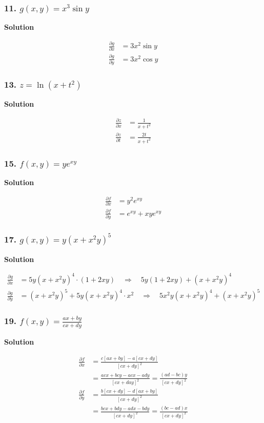 \documentclass{article}
\newcommand\rr{\quad\Rightarrow\quad}
\newcommand{\solution}{\centerline{\textbf{Solution}}}
\begin{document}
\subsubsection*{11. $g(x,y) = x^3 \sin y$}
\solution
\begin{align*}
    \frac{\partial g}{\partial x} &= 3x^2\sin y \\
    \frac{\partial g}{\partial y} &= 3x^2\cos y 
\end{align*}
\subsubsection*{13. $z = \ln (x + t^2)$}
\solution
\begin{align*}
    \frac{\partial z}{\partial x} &= \displaystyle\frac{1}{x+t^2} \\
    \frac{\partial z}{\partial t} &= \displaystyle\frac{2t}{x+t^2} 
\end{align*}
\subsubsection*{15. $f(x,y) = ye^{xy}$}
\solution
\begin{align*}
    \frac{\partial f}{\partial x} &= y^2e^{xy} \\
    \frac{\partial f}{\partial y} &= e^{xy} + xye^{xy}
\end{align*}
\subsubsection*{17. $g(x,y) = y(x + x^2 y)^5$}
\solution
\begin{align*}
    \frac{\partial g}{\partial x} &= 5y(x+x^2y)^4\cdot (1+2xy) \rr 5y(1+2xy) + (x+x^2y)^4 \\
    \frac{\partial g}{\partial y} &= (x+x^2y)^5 + 5y(x+x^2y)^4 \cdot x^2 \rr 5x^2y(x+x^2y)^4 + (x+x^2y)^5
\end{align*}
\subsubsection*{19. $f(x,y) = \displaystyle\frac{ax + by}{cx + dy}$}
\solution
\begin{align*}
    \frac{\partial f}{\partial x} &= \displaystyle\frac{c[ax+by] - a[cx+dy]}{[cx+dy]^2} \\
                    &= \displaystyle\frac{acx+bcy-acx-ady}{[cx+day]^2} = \displaystyle\frac{(ad-bc)y}{[cx+dy]^2} \\
    \frac{\partial f}{\partial y} &= \displaystyle\frac{b[cx+dy] - d[ax+by]}{[cx+dy]^2} \\ 
                                  &= \displaystyle\frac{bcx+bdy-adx-bdy}{[cx+dy]^2} = \displaystyle\frac{(bc-ad)x}{[cx+dy]^2}
\end{align*}
\end{document}
